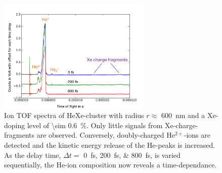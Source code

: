 %
\begin{figure}
	\centering
		\includegraphics[width=0.65\textwidth]{images/results/TOF-helium-xenon-cluster-60.png}
	\caption[TOF spectra of HeXe-clusters with a \SI{\sim 0.6}{\percent} Xe-doping at various $\Delta t$.]{Ion TOF spectra of HeXe-cluster with radius $r\approx$ \SI{600}{\nano\meter} and a Xe-doping level of \SI{\sim 0.6}{\percent}. Only little signals from Xe-charge-fragments are observed. Conversely, doubly-charged He$^{2+}$-ions are detected and the kinetic energy release of the He-peaks is increased. As the delay time, $\Delta t=$ \SIlist{0;200;800}{\femto\second}, is varied sequentially, the He-ion composition now reveals a time-dependance.}
	\label{fig:TOF-helium-xenon-cluster-60}
\end{figure}
%
